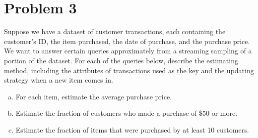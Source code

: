 \documentclass{article}
\begin{document}
\section*{Problem 3}
\begin{tcolorbox}[colback=gray!10, breakable]
	Suppose we have a dataset of customer transactions, each containing the customer's ID, the item purchased, the date of purchase, and the purchase price. We want to answer certain queries approximately from a streaming sampling of a portion of the dataset. For each of the queries below, describe the estimating method, including the attributes of transactions used as the key and the updating strategy when a new item comes in.
\begin{enumerate}[(a)]
	\item For each item, estimate the average purchase price.
	\item Estimate the fraction of customers who made a purchase of \$50 or more.
	\item Estimate the fraction of items that were purchased by at least 10 customers.
\end{enumerate}
\end{tcolorbox}
\end{document}
